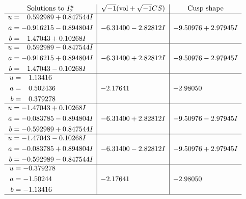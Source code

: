 \documentclass[1p]{elsarticle_modified}
\theoremstyle{definition}
\newcommand{\I}{\sqrt{-1}}
\begin{document}
$$\begin{array}{c|c|c}  
\text{Solutions to }I^u_{2}& \I (\text{vol} + \sqrt{-1}CS) & \text{Cusp shape}\\
 \hline 
\begin{aligned}
u &= \phantom{-}0.592989 + 0.847544 I \\
a &= -0.916215 - 0.894804 I \\
b &= \phantom{-}1.47043 + 0.10268 I\end{aligned}
 & -6.31400 - 2.82812 I & -9.50976 + 2.97945 I \\ \hline\begin{aligned}
u &= \phantom{-}0.592989 - 0.847544 I \\
a &= -0.916215 + 0.894804 I \\
b &= \phantom{-}1.47043 - 0.10268 I\end{aligned}
 & -6.31400 + 2.82812 I & -9.50976 - 2.97945 I \\ \hline\begin{aligned}
u &= \phantom{-}1.13416\phantom{ +0.000000I} \\
a &= \phantom{-}0.502436\phantom{ +0.000000I} \\
b &= \phantom{-}0.379278\phantom{ +0.000000I}\end{aligned}
 & -2.17641\phantom{ +0.000000I} & -2.98050\phantom{ +0.000000I} \\ \hline\begin{aligned}
u &= -1.47043 + 0.10268 I \\
a &= -0.083785 - 0.894804 I \\
b &= -0.592989 + 0.847544 I\end{aligned}
 & -6.31400 + 2.82812 I & -9.50976 - 2.97945 I \\ \hline\begin{aligned}
u &= -1.47043 - 0.10268 I \\
a &= -0.083785 + 0.894804 I \\
b &= -0.592989 - 0.847544 I\end{aligned}
 & -6.31400 - 2.82812 I & -9.50976 + 2.97945 I \\ \hline\begin{aligned}
u &= -0.379278\phantom{ +0.000000I} \\
a &= -1.50244\phantom{ +0.000000I} \\
b &= -1.13416\phantom{ +0.000000I}\end{aligned}
 & -2.17641\phantom{ +0.000000I} & -2.98050\phantom{ +0.000000I}\\
 \hline 
 \end{array}$$\newpage\newpage\renewcommand{\arraystretch}{1}
\end{document}
